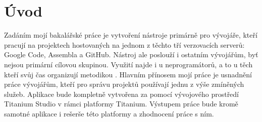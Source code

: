 \chapter{Úvod}

Zadáním mojí bakalářské práce je vytvoření nástroje primárně pro vývojáře, kteří pracují na projektech hostovaných na jednom z těchto tří verzovacích serverů: Google Code, Assembla a GitHub. Nástroj ale poslouží i ostatním vývojářům, byť nejsou primární cílovou skupinou. Využití najde i u neprogramátorů, a to u těch kteří svůj čas organizují metodikou . Hlavním přínosem mojí práce je usnadnění práce vývojářům, kteří pro správu projektů používají jednu z výše zmíněných služeb. Aplikace bude kompletně vytvořena za pomocí vývojového prostředí Titanium Studio v rámci platformy Titanium. Výstupem práce bude kromě samotné aplikace i rešerše této platformy a zhodnocení práce s ním.